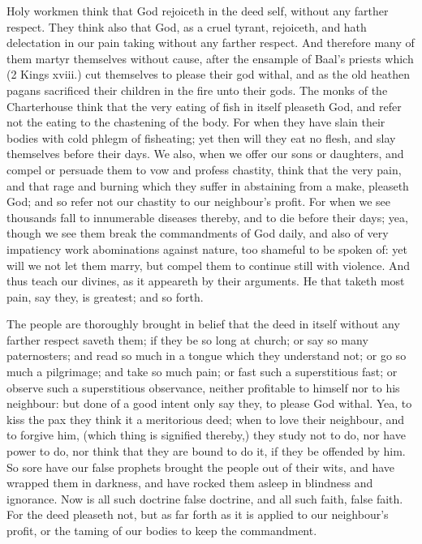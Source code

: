 Holy workmen think that God rejoiceth in the deed 
self, without any farther respect. They think also that 
God, as a cruel tyrant, rejoiceth, and hath delectation in 
our pain taking without any farther respect. And therefore
many of them martyr themselves without cause, after 
the ensample of Baal's priests which (2 Kings xviii.) cut 
themselves to please their god withal, and as the old heathen
pagans sacrificed their children in the fire unto their 
gods. The monks of the Charterhouse think that the very 
eating of fish in itself pleaseth God, and refer not the 
eating to the chastening of the body. For when they have 
slain their bodies with cold phlegm of fisheating; yet then 
will they eat no flesh, and slay themselves before their 
days. We also, when we offer our sons or daughters, and 
compel or persuade them to vow and profess chastity, 
think that the very pain, and that rage and burning which 
they suffer in abstaining from a make, pleaseth God; and 
so refer not our chastity to our neighbour's profit. For 
when we see thousands fall to innumerable diseases thereby,
and to die before their days; yea, though we see them 
break the commandments of God daily, and also of very 
impatiency work abominations against nature, too shameful
to be spoken of: yet will we not let them marry, but 
compel them to continue still with violence. And thus 
teach our divines, as it appeareth by their arguments. He 
that taketh most pain, say they, is greatest; and so forth. 

The people are thoroughly brought in belief that the 
deed in itself without any farther respect saveth them; 
if they be so long at church; or say so many paternosters; 
and read so much in a tongue which they understand not; 
or go so much a pilgrimage; and take so much pain; or 
fast such a superstitious fast; or observe such a superstitious
observance, neither profitable to himself nor to his 
neighbour: but done of a good intent only say they, to 
please God withal. Yea, to kiss the pax they think it a meritorious
deed; when to love their neighbour, and to forgive
him, (which thing is signified thereby,) they study not 
to do, nor have power to do, nor think that they are 
bound to do it, if they be offended by him. So sore 
have our false prophets brought the people out of their 
wits, and have wrapped them in darkness, and have rocked 
them asleep in blindness and ignorance. Now is all such 
doctrine false doctrine, and all such faith, false faith. For 
the deed pleaseth not, but as far forth as it is applied to 
our neighbour's profit, or the taming of our bodies to keep 
the commandment. 

